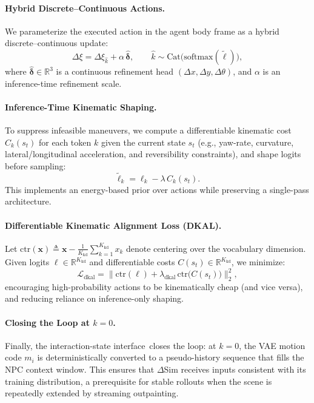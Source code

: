 \documentclass{article}
\newcommand{\InteractionState}{interaction-state interface}
\theoremstyle{plain}
\theoremstyle{definition}
\theoremstyle{remark}
\begin{document}
\paragraph{Hybrid Discrete--Continuous Actions.}
We parameterize the executed action in the agent body frame as a hybrid discrete--continuous update:
\begin{equation}
\label{eq:deltasim_action}
\Delta \xi
= \Delta \xi_{\hat{k}} + \alpha\,\widehat{\boldsymbol{\delta}},
\qquad
\hat{k} \sim \mathrm{Cat}\!\big(\mathrm{softmax}(\tilde{\ell})\big),
\end{equation}
where \(\widehat{\boldsymbol{\delta}} \in  \mathbb{R}^{3}\) is a continuous refinement head \((\Delta x,\Delta y,\Delta\theta)\), and \(\alpha\) is an inference-time refinement scale.

\paragraph{Inference-Time Kinematic Shaping.}
To suppress infeasible maneuvers, we compute a differentiable kinematic cost \(C_k(s_t)\) for each token \(k\) given the current state \(s_t\)
(e.g., yaw-rate, curvature, lateral/longitudinal acceleration, and reversibility constraints),
and shape logits before sampling:
\begin{equation}
\label{eq:deltasim_shaping}
\tilde{\ell}_k = \ell_k - \lambda\, C_k(s_t).
\end{equation}
This implements an energy-based prior over actions while preserving a single-pass architecture.

\paragraph{Differentiable Kinematic Alignment Loss (DKAL).}
Let \(\mathrm{ctr}(\mathbf{x}) \triangleq \mathbf{x} - \frac{1}{K_{\mathrm{kd}}}\sum_{k=1}^{K_{\mathrm{kd}}} x_k\) denote centering over the vocabulary dimension.
Given logits \(\ell\in\mathbb{R}^{K_{\mathrm{kd}}}\) and differentiable costs \(C(s_t)\in\mathbb{R}^{K_{\mathrm{kd}}}\), we minimize:
\begin{equation}
\label{eq:deltasim_dkal}
\mathcal{L}_{\mathrm{dkal}}
=
\big\lVert
\mathrm{ctr}(\ell)
+
\lambda_{\mathrm{dkal}}\, \mathrm{ctr}\!\big(C(s_t)\big)
\big\rVert_2^2,
\end{equation}
encouraging high-probability actions to be kinematically cheap (and vice versa), and reducing reliance on inference-only shaping.

\paragraph{Closing the Loop at \(k=0\).}
Finally, the \InteractionState\ closes the loop:
at \(k=0\), the VAE motion code \(m_i\) is deterministically converted to a pseudo-history sequence that fills the NPC context window.
This ensures that \(\Delta\)Sim receives inputs consistent with its training distribution, a prerequisite for stable rollouts when the scene is repeatedly extended by streaming outpainting.
\end{document}
